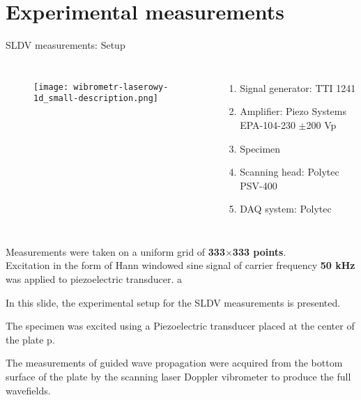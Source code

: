 \documentclass[10pt,aspectratio=169,dvipsnames]{beamer} %
\begin{document}
	\section*{Experimental measurements}
	\begin{frame}[t]{SLDV measurements: Setup}
		\begin{columns}[T]
			\begin{figure}
				\texttt{[image: wibrometr-laserowy-1d\_small-description.png]}
			\end{figure}
			\begin{enumerate}
				\item Signal generator: TTI 1241 
				\item Amplifier: Piezo Systems EPA-104-230 $\pm$200 Vp
				\item Specimen
				\item Scanning head: Polytec PSV-400
				\item DAQ system: Polytec
			\end{enumerate}
		\end{columns}
		{\small
			Measurements were taken on a uniform grid of \textbf{333$\times$333 points}.\\
			Excitation in the form of Hann windowed sine signal of carrier frequency \textbf{50 kHz} was applied to piezoelectric transducer.}
a	\end{frame}
	\note
	{
		In this slide, the experimental setup for the SLDV measurements is presented.
		
		The specimen was excited using a Piezoelectric transducer placed at the center of the plate p.
		
		The measurements of guided wave propagation were acquired from the bottom surface of the plate by the scanning laser Doppler vibrometer to produce the full wavefields.	
	}
\end{document}
